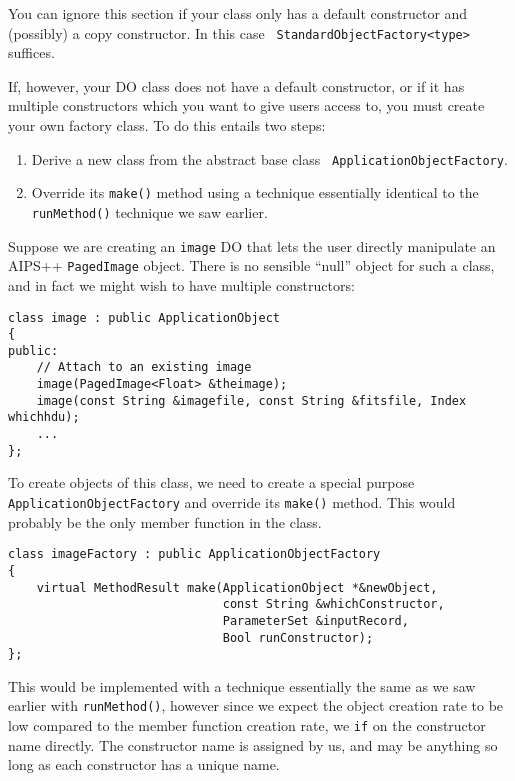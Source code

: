 You can ignore this section if your class only has a default
constructor and (possibly) a copy constructor. In this case {\tt
StandardObjectFactory<type>} suffices.

If, however, your DO class does not have a default constructor, or if it has
multiple constructors which you want to give users access to, you must
create your own factory class. To do this entails two steps:
\begin{enumerate}
    \item Derive a new class from the abstract base class {\tt
    ApplicationObjectFactory}.
  \item Override its {\tt make()} method using a technique essentially
  identical to the {\tt runMethod()} technique we saw earlier.
\end{enumerate}

Suppose we are creating an {\tt image} DO that lets the user directly
manipulate an AIPS++ {\tt PagedImage} object. There is no sensible
``null'' object for such a class, and in fact we might wish to have
multiple constructors:

\begin{verbatim}
class image : public ApplicationObject
{
public:
    // Attach to an existing image
    image(PagedImage<Float> &theimage);
    image(const String &imagefile, const String &fitsfile, Index whichhdu);
    ...
};      
\end{verbatim}

To create objects of this class, we need to create a special purpose
{\tt ApplicationObjectFactory} and override its {\tt make()}
method. This would probably be the only member function in the class.

\begin{verbatim}
class imageFactory : public ApplicationObjectFactory
{
    virtual MethodResult make(ApplicationObject *&newObject,
                              const String &whichConstructor,
                              ParameterSet &inputRecord,
                              Bool runConstructor);
};
\end{verbatim}

This would be implemented with a technique essentially the same as we saw
earlier with {\tt runMethod()}, however since we expect the object
creation rate to be low compared to the member function creation rate,
we {\tt if} on the constructor name directly. The constructor name is
assigned by us, and may be anything so long as each constructor has a
unique name.

